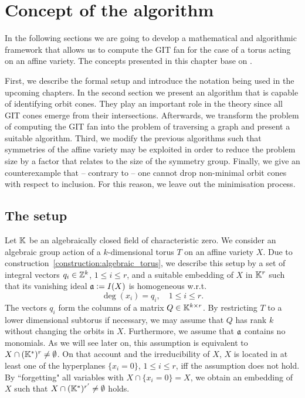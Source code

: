 \chapter{Concept of the algorithm}
\label{chap:algorithm}

In the following sections we are going to develop a mathematical and algorithmic framework that allows us to compute the GIT fan for the case of a torus acting on an affine variety. The concepts presented in this chapter base on \cite{gitfan_symmetry, gitfan}.

First, we describe the formal setup and introduce the notation being used in the upcoming chapters. In the second section we present an algorithm that is capable of identifying orbit cones. They play an important role in the theory since all GIT cones emerge from their intersections. Afterwards, we transform the problem of computing the GIT fan into the problem of traversing a graph and present a suitable algorithm. Third, we modify the previous algorithms such that symmetries of the affine variety may be exploited in order to reduce the problem size by a factor that relates to the size of the symmetry group. Finally, we give an counterexample that -- contrary to \cite{gitfan_symmetry} -- one cannot drop non-minimal orbit cones with respect to inclusion. For this reason, we leave out the minimisation process.

\section{The setup}
\label{section:setup}

Let $\mathbb{K}$ be an algebraically closed field of characteristic zero. We consider an algebraic group action of a $k$-dimensional torus $T$ on an affine variety $X$. Due to construction~\ref{construction:algebraic_torus}, we describe this setup by a set of integral vectors $q_i\in\mathbb{Z}^k$, $1\leq i \leq r$, and a suitable embedding of $X$ in $\mathbb{K}^r$ such that its vanishing ideal $\mathfrak{a} \mathrel{\mathop:}= I(X)$ is homogeneous w.r.t.
$$\deg(x_i) = q_i,\quad 1\leq i \leq r.$$
The vectors $q_i$ form the columns of a matrix $Q\in\mathbb{K}^{k\times r}$. By restricting $T$ to a lower dimensional subtorus if necessary, we may assume that $Q$ has rank $k$ without changing the orbits in $X$. Furthermore, we assume that $\mathfrak{a}$ contains no monomials. As we will see later on, this assumption is equivalent to $X\cap (\mathbb{K}^*)^r \neq \emptyset$. On that account and the irreducibility of $X$, $X$ is located in at least one of the hyperplanes $\{x_i = 0\}$, $1\leq i \leq r$, iff the assumption does not hold. By ``forgetting" all variables with $X\cap \{x_i = 0\} = X$, we obtain an embedding of $X$ such that $X\cap (\mathbb{K}^*)^{r'} \neq \emptyset$ holds.

